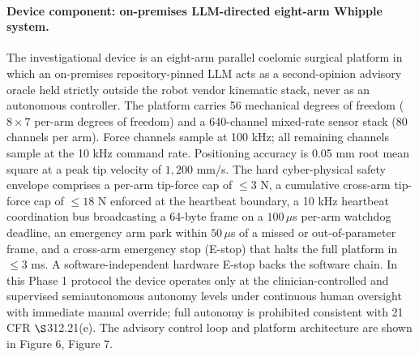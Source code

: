 \paragraph{Device component: on-premises LLM-directed eight-arm Whipple system.}
The investigational device is an eight-arm parallel coelomic surgical platform in
which an on-premises repository-pinned LLM acts as a second-opinion advisory oracle
held strictly outside the robot vendor kinematic stack, never as an autonomous
controller. The platform carries 56 mechanical degrees of freedom ($8\times7$
per-arm degrees of freedom) and a 640-channel mixed-rate sensor stack (80 channels
per arm). Force channels sample at 100 kHz; all remaining channels sample at the
10 kHz command rate. Positioning accuracy is 0.05 mm root mean square at a peak tip
velocity of $1{,}200$ mm/s. The hard cyber-physical safety envelope comprises a
per-arm tip-force cap of $\leq 3$ N, a cumulative cross-arm tip-force cap of
$\leq 18$ N enforced at the heartbeat boundary, a 10 kHz heartbeat coordination bus
broadcasting a 64-byte frame on a $100\,\mu$s per-arm watchdog deadline, an
emergency arm park within $50\,\mu$s of a missed or out-of-parameter frame, and a
cross-arm emergency stop (E-stop) that halts the full platform in $\leq 3$ ms.
A software-independent hardware E-stop backs the software chain. In this Phase 1
protocol the device operates only at the clinician-controlled and supervised
semiautonomous autonomy levels under continuous human oversight with immediate
manual override; full autonomy is prohibited consistent with 21 CFR
$\S$312.21(e). The advisory control loop and platform architecture are shown
in Figure 6, Figure 7.

